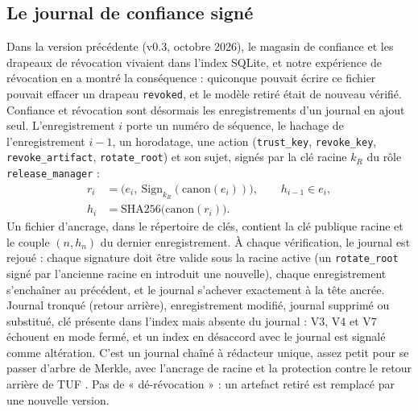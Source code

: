\documentclass[conference]{IEEEtran}
\begin{document}
\subsection{Le journal de confiance signé}
Dans la version précédente (v0.3, octobre 2026), le magasin de confiance et les drapeaux de révocation vivaient dans l'index SQLite, et notre expérience de révocation en a montré la conséquence : quiconque pouvait écrire ce fichier pouvait effacer un drapeau \texttt{revoked}, et le modèle retiré était de nouveau vérifié. Confiance et révocation sont désormais les enregistrements d'un journal en ajout seul. L'enregistrement $i$ porte un numéro de séquence, le hachage de l'enregistrement $i-1$, un horodatage, une action (\texttt{trust\_key}, \texttt{revoke\_key}, \texttt{revoke\_artifact}, \texttt{rotate\_root}) et son sujet, signés par la clé racine $k_R$ du rôle \texttt{release\_manager} :
\begin{align}
r_i &= \bigl(e_i,\ \mathrm{Sign}_{k_R}(\mathrm{canon}(e_i))\bigr),\qquad h_{i-1}\in e_i, \label{eq:log}\\
h_i &= \mathrm{SHA256}\bigl(\mathrm{canon}(r_i)\bigr). \nonumber
\end{align}
Un fichier d'ancrage, dans le répertoire de clés, contient la clé publique racine et le couple $(n, h_n)$ du dernier enregistrement. À chaque vérification, le journal est rejoué : chaque signature doit être valide sous la racine active (un \texttt{rotate\_root} signé par l'ancienne racine en introduit une nouvelle), chaque enregistrement s'enchaîner au précédent, et le journal s'achever exactement à la tête ancrée. Journal tronqué (retour arrière), enregistrement modifié, journal supprimé ou substitué, clé présente dans l'index mais absente du journal : V3, V4 et V7 échouent en mode fermé, et un index en désaccord avec le journal est signalé comme altération. C'est un journal chaîné à rédacteur unique, assez petit pour se passer d'arbre de Merkle, avec l'ancrage de racine et la protection contre le retour arrière de TUF \cite{tuf2010}. Pas de « dé-révocation » : un artefact retiré est remplacé par une nouvelle version.
\end{document}
